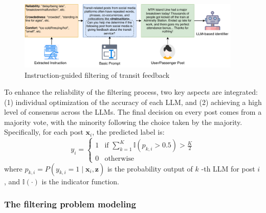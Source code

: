 \documentclass[a4paper,fleqn,12pt]{cas-sc}
\begin{document}
\begin{figure}[htbp]
\centering
\includegraphics[width=0.95\textwidth]{figs/instru_cept.pdf}
\caption{Instruction-guided filtering of transit feedback}\label{fig:instru_cept}
\end{figure}

To enhance the reliability of the filtering process, two key aspects are integrated: (1) individual optimization of the accuracy of each LLM, and (2) achieving a high level of consensus across the LLMs. The final decision on every post comes from a majority vote, with the minority following the choice taken by the majority. Specifically, for each post \(\boldsymbol{x}_i\), the predicted label is:
\begin{equation}
y_i = \begin{cases} 
1 & \text{if } \sum_{k=1}^{K} \mathbb{I}(p_{k,i} > 0.5) > \frac{K}{2} \\
0 & \text{otherwise}
\end{cases}
\end{equation}
where \(p_{k,i} = P(y_{k,i} = 1 \mid \boldsymbol{x}_i, \boldsymbol{z})\) is the probability output of \(k\) -th LLM for post \(i\), and \(\mathbb{I}(\cdot)\) is the indicator function.

\subsubsection{The filtering problem modeling}
\end{document}
